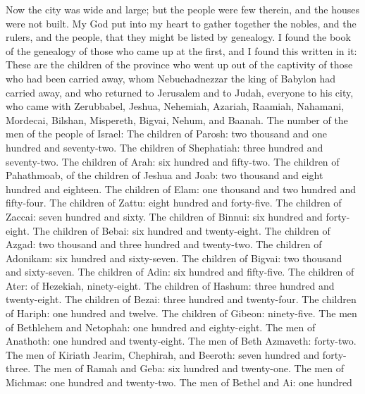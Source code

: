  Now the city was wide and large; but the people were few
therein, and the houses were not built.  My God put into
my heart to gather together the nobles, and the rulers, and the people,
that they might be listed by genealogy. I found the book of the
genealogy of those who came up at the first, and I found this written in
it:  These are the children of the province who went up
out of the captivity of those who had been carried away, whom
Nebuchadnezzar the king of Babylon had carried away, and who returned to
Jerusalem and to Judah, everyone to his city,  who came
with Zerubbabel, Jeshua, Nehemiah, Azariah, Raamiah, Nahamani, Mordecai,
Bilshan, Mispereth, Bigvai, Nehum, and Baanah. The number of the men of
the people of Israel:  The children of Parosh: two
thousand and one hundred and seventy-two.  The children of
Shephatiah: three hundred and seventy-two.  The children
of Arah: six hundred and fifty-two.  The children of
Pahathmoab, of the children of Jeshua and Joab: two thousand and eight
hundred and eighteen.  The children of Elam: one thousand
and two hundred and fifty-four.  The children of Zattu:
eight hundred and forty-five.  The children of Zaccai:
seven hundred and sixty.  The children of Binnui: six
hundred and forty-eight.  The children of Bebai: six
hundred and twenty-eight.  The children of Azgad: two
thousand and three hundred and twenty-two.  The children
of Adonikam: six hundred and sixty-seven.  The children
of Bigvai: two thousand and sixty-seven.  The children of
Adin: six hundred and fifty-five.  The children of Ater:
of Hezekiah, ninety-eight.  The children of Hashum: three
hundred and twenty-eight.  The children of Bezai: three
hundred and twenty-four.  The children of Hariph: one
hundred and twelve.  The children of Gibeon: ninety-five.
 The men of Bethlehem and Netophah: one hundred and
eighty-eight.  The men of Anathoth: one hundred and
twenty-eight.  The men of Beth Azmaveth: forty-two.
 The men of Kiriath Jearim, Chephirah, and Beeroth: seven
hundred and forty-three.  The men of Ramah and Geba: six
hundred and twenty-one.  The men of Michmas: one hundred
and twenty-two.  The men of Bethel and Ai: one hundred
